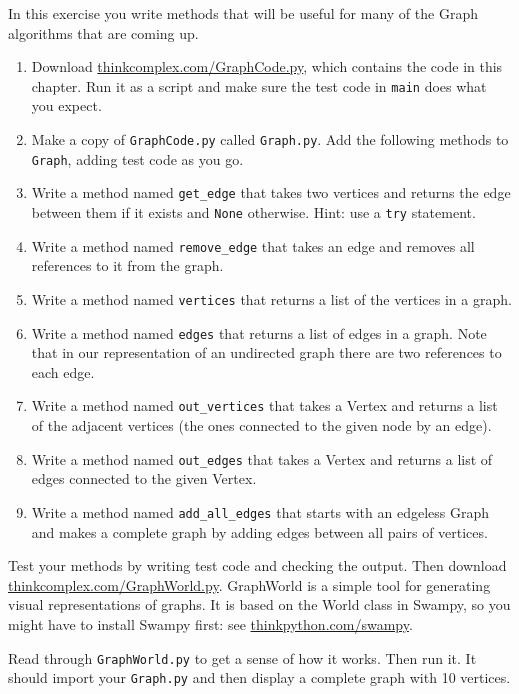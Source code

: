 \documentclass[10pt]{book}
\begin{document}
\begin{exercise}

In this exercise you write methods that will be
useful for many of the Graph algorithms that are coming up.

\begin{enumerate}

\item Download \url{thinkcomplex.com/GraphCode.py}, which
  contains the code in this chapter.  Run it as a script and make sure
  the test code in {\tt main} does what you expect.

\item Make a copy of {\tt GraphCode.py} called {\tt Graph.py}.  Add
  the following methods to {\tt Graph}, adding test code as you go.

\item Write a method named \verb"get_edge" that takes two vertices and
  returns the edge between them if it exists and {\tt None} otherwise.
  Hint: use a {\tt try} statement.

\item Write a method named \verb"remove_edge" that takes an edge and
  removes all references to it from the graph.

\item Write a method named {\tt vertices} that returns a list of the
  vertices in a graph.

\item Write a method named {\tt edges} that returns a list of edges in
  a graph.  Note that in our representation of an undirected graph
  there are two references to each edge.

\item Write a method named \verb"out_vertices" that takes a Vertex and
  returns a list of the adjacent vertices (the ones connected to the
  given node by an edge).

\item Write a method named \verb"out_edges" that takes a Vertex and
  returns a list of edges connected to the given Vertex.

\item Write a method named \verb"add_all_edges" that starts with an
  edgeless Graph and makes a complete graph by adding edges between
  all pairs of vertices.

\end{enumerate}

Test your methods by writing test code and checking the output.  Then
download \url{thinkcomplex.com/GraphWorld.py}.  GraphWorld is
a simple tool for generating visual representations of graphs.  It is
based on the World class in Swampy, so you might have to install
Swampy first: see \url{thinkpython.com/swampy}.

Read through {\tt GraphWorld.py} to get a sense of how it works.  Then
run it.  It should import your {\tt Graph.py} and then display a
complete graph with 10 vertices.

\end{exercise}
\end{document}
